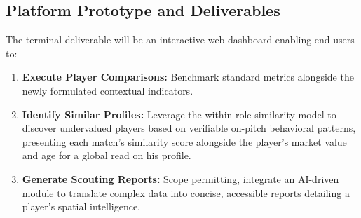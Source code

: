 \documentclass[12pt,a4paper]{article}
\begin{document}
\subsection{Platform Prototype and Deliverables}
The terminal deliverable will be an interactive web dashboard enabling end-users to:
\begin{enumerate}
    \item \textbf{Execute Player Comparisons:} Benchmark standard metrics alongside the newly formulated contextual indicators.
    \item \textbf{Identify Similar Profiles:} Leverage the within-role similarity model to discover undervalued players based on verifiable on-pitch behavioral patterns, presenting each match's similarity score alongside the player's market value and age for a global read on his profile.
    \item \textbf{Generate Scouting Reports:} Scope permitting, integrate an AI-driven module to translate complex data into concise, accessible reports detailing a player's spatial intelligence.
\end{enumerate}
\end{document}
